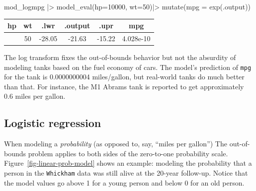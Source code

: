 \documentclass[
  letterpaper,
  DIV=11,
  numbers=noendperiod,
  oneside]{scrartcl}
\newenvironment{Shaded}{\begin{snugshade}}{\end{snugshade}}
\newcommand{\AttributeTok}[1]{\textcolor[rgb]{0.40,0.45,0.13}{#1}}
\newcommand{\DecValTok}[1]{\textcolor[rgb]{0.68,0.00,0.00}{#1}}
\newcommand{\FunctionTok}[1]{\textcolor[rgb]{0.28,0.35,0.67}{#1}}
\newcommand{\NormalTok}[1]{\textcolor[rgb]{0.00,0.23,0.31}{#1}}
\newcommand{\SpecialCharTok}[1]{\textcolor[rgb]{0.37,0.37,0.37}{#1}}
\begin{document}
\begin{Shaded}
\begin{Highlighting}[]
\NormalTok{mod\_logmpg }\SpecialCharTok{|\textgreater{}} \FunctionTok{model\_eval}\NormalTok{(}\AttributeTok{hp=}\DecValTok{10000}\NormalTok{, }\AttributeTok{wt=}\DecValTok{50}\NormalTok{)}\SpecialCharTok{|\textgreater{}}
  \FunctionTok{mutate}\NormalTok{(}\AttributeTok{mpg =} \FunctionTok{exp}\NormalTok{(.output))}
\end{Highlighting}
\end{Shaded}

\begin{longtable}[]{@{}cccccc@{}}
\toprule\noalign{}
hp & wt & .lwr & .output & .upr & mpg \\
\midrule\noalign{}
\endhead
\bottomrule\noalign{}
\endlastfoot
10000 & 50 & -28.05 & -21.63 & -15.22 & 4.028e-10 \\
\end{longtable}

The log transform fixes the out-of-bounds behavior but not the absurdity
of modeling tanks based on the fuel economy of cars. The model's
prediction of \texttt{mpg} for the tank is 0.0000000004 miles/gallon,
but real-world tanks do much better than that. For instance, the M1
Abrams tank is reported to get approximately 0.6 miles per gallon.

\subsection{Logistic regression}\label{sec-logistic-regression}

When modeling a \emph{probability} (as opposed to, say, ``miles per
gallon'') The out-of-bounds problem applies to both sides of the
zero-to-one probability scale. Figure~\ref{fig-linear-prob-model} shows
an example: modeling the probability that a person in the
\texttt{Whickham} data was still alive at the 20-year follow-up. Notice
that the model values go above 1 for a young person and below 0 for an
old person.
\end{document}
